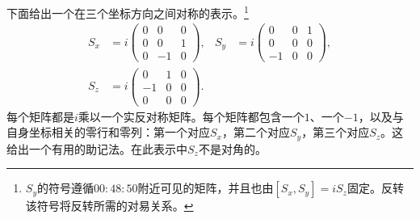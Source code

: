 下面给出一个在三个坐标方向之间对称的表示。\footnote{\(S_y\)的符号遵循\(00{:}48{:}50\)附近可见的矩阵，并且也由\([S_x,S_y]=iS_z\)固定。反转该符号将反转所需的对易关系。}
\begin{equation}
\begin{aligned}
S_x
&=
i
\begin{pmatrix}
0&0&0\\
0&0&1\\
0&-1&0
\end{pmatrix},
&
S_y
&=
i
\begin{pmatrix}
0&0&1\\
0&0&0\\
-1&0&0
\end{pmatrix},\\
S_z
&=
i
\begin{pmatrix}
0&1&0\\
-1&0&0\\
0&0&0
\end{pmatrix}.
\end{aligned}
\end{equation}
每个矩阵都是\(i\)乘以一个实反对称矩阵。每个矩阵都包含一个\(1\)、一个\(-1\)，以及与自身坐标相关的零行和零列：第一个对应\(S_x\)，第二个对应\(S_y\)，第三个对应\(S_z\)。这给出一个有用的助记法。在此表示中\(S_z\)不是对角的。

